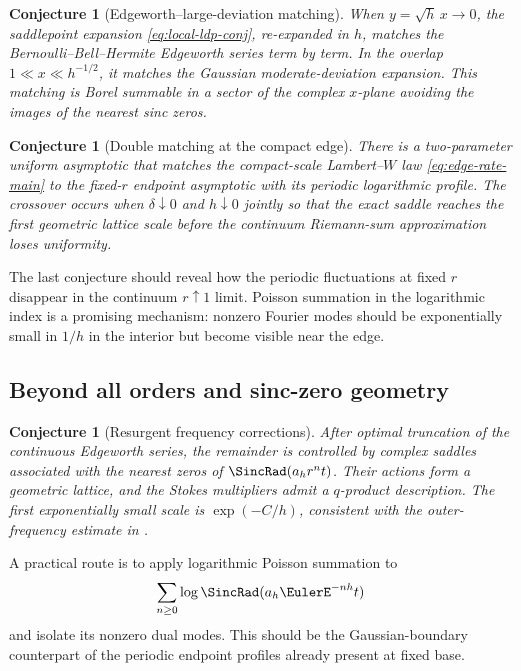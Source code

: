 \documentclass[11pt]{article}
\numberwithin{equation}{section}
\newtheorem{conjecture}[theorem]{Conjecture}
\theoremstyle{definition}
\begin{document}
\begin{conjecture}[Edgeworth--large-deviation matching]\label{conj:matching}
When \(y=\sqrt h\,x\to0\), the saddlepoint expansion \eqref{eq:local-ldp-conj}, re-expanded in \(h\), matches the Bernoulli--Bell--Hermite Edgeworth series term by term.  In the overlap \(1\ll x\ll h^{-1/2}\), it matches the Gaussian moderate-deviation expansion.  This matching is Borel summable in a sector of the complex \(x\)-plane avoiding the images of the nearest sinc zeros.
\end{conjecture}

\begin{conjecture}[Double matching at the compact edge]\label{conj:edge-matching}
There is a two-parameter uniform asymptotic that matches the compact-scale Lambert--\(W\) law \eqref{eq:edge-rate-main} to the fixed-\(r\) endpoint asymptotic with its periodic logarithmic profile.  The crossover occurs when \(\delta\downarrow0\) and \(h\downarrow0\) jointly so that the exact saddle reaches the first geometric lattice scale before the continuum Riemann-sum approximation loses uniformity.
\end{conjecture}

The last conjecture should reveal how the periodic fluctuations at fixed \(r\) disappear in the continuum \(r\uparrow1\) limit.  Poisson summation in the logarithmic index is a promising mechanism: nonzero Fourier modes should be exponentially small in \(1/h\) in the interior but become visible near the edge.

\subsection{Beyond all orders and sinc-zero geometry}
\begin{conjecture}[Resurgent frequency corrections]\label{conj:resurgence}
After optimal truncation of the continuous Edgeworth series, the remainder is controlled by complex saddles associated with the nearest zeros of \(\SincRad(a_hr^nt)\).  Their actions form a geometric lattice, and the Stokes multipliers admit a \(q\)-product description.  The first exponentially small scale is \(\exp(-C/h)\), consistent with the outer-frequency estimate in .
\end{conjecture}

A practical route is to apply logarithmic Poisson summation to
\[
 \sum_{n\ge0}\log\SincRad(a_h\EulerE^{-nh}t)
\]
and isolate its nonzero dual modes.  This should be the Gaussian-boundary counterpart of the periodic endpoint profiles already present at fixed base.
\end{document}
